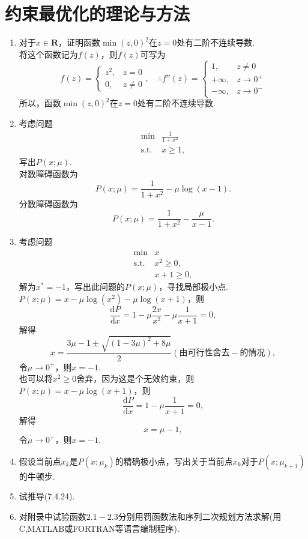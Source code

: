 \section{约束最优化的理论与方法}
\begin{enumerate}
    \item 对于$x \in \textbf{R}$，证明函数$\min(z,0)^2$在$z=0$处有二阶不连续导数.\\
    \pro 将这个函数记为$f(z)$，则$f(z)$可写为
    \[f(z) = \begin{cases}
        z^2, & z = 0\\
        0, & z \neq 0
    \end{cases},\quad\therefore
    f''(z)=\begin{cases}
        1, & z \neq 0\\+ \infty, & z\to 0^+\\-\infty, & z\to 0^-
    \end{cases}\]
    所以，函数$\min(z,0)^2$在$z=0$处有二阶不连续导数.
    \item 考虑问题
    \[\begin{array}{lll}
        \min & \displaystyle \frac{1}{1+x^2}\\
        \mathrm{s.t.} & x \geqslant 1,
    \end{array}\]
    写出$P(x;\mu)$.\\
    \sol 对数障碍函数为
    \[P(x;\mu)=\frac{1}{1+x^2}-\mu\log(x-1).\]
    分数障碍函数为
    \[P(x;\mu)=\frac{1}{1+x^2}-\frac{\mu}{x-1}.\]
    \item 考虑问题
    \[\begin{array}{lll}
        \min & x\\
        \mathrm{s.t.} & x^2 \geqslant 0,\\
        & x+1 \geqslant 0,
    \end{array}\]
    解为$x^*=-1$，写出此问题的$P(x;\mu)$，寻找局部极小点.\\
    \sol $P(x;\mu)=x-\mu\log(x^2)-\mu\log(x+1)$，则
    \[\frac{\mathrm{d} P}{\mathrm{d} x}=1-\mu\frac{2x}{x^2}-\mu\frac{1}{x+1}=0,\]
    解得\[x = \frac{3\mu-1 \pm \sqrt{(1-3\mu)^2+8\mu}}{2}(\text{由可行性舍去}-\text{的情况}),\]
    令$\mu \to 0^+$，则$x=-1$.\\
    也可以将$x^2 \geqslant 0$舍弃，因为这是个无效约束，则$P(x;\mu)=x-\mu\log(x+1)$，则
    \[\frac{\mathrm{d} P}{\mathrm{d} x}=1-\mu\frac{1}{x+1}=0,\]
    解得\[x=\mu-1,\]
    令$\mu \to 0^+$，则$x=-1$.
    \item 假设当前点$x_k$是$P(x;\mu_k)$的精确极小点，写出关于当前点$x_k$对于$P(x;\mu_{k+1})$的牛顿步.\\
    \omitted
    \item 试推导(7.4.24).\\
    \omitted
    \item 对附录中试验函数$2.1-2.3$分别用罚函数法和序列二次规划方法求解(用C,MATLAB或FORTRAN等语言编制程序).\\
    \omitted
\end{enumerate}
